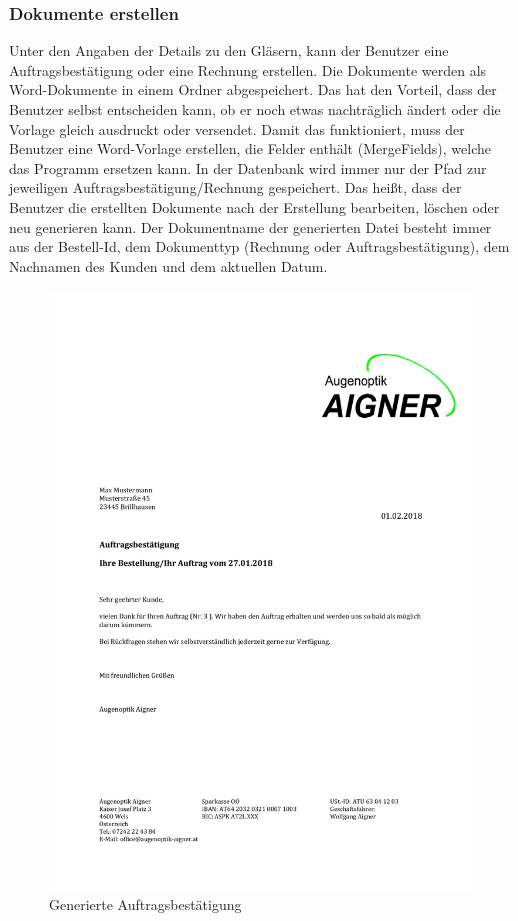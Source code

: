 \subsubsection{Dokumente erstellen}
Unter den Angaben der Details zu den Gläsern, kann der Benutzer eine Auftragsbestätigung oder eine Rechnung erstellen. Die Dokumente werden als Word-Dokumente in einem Ordner abgespeichert. Das hat den Vorteil, dass der Benutzer selbst entscheiden kann, ob er noch etwas nachträglich ändert oder die Vorlage gleich ausdruckt oder versendet. Damit das funktioniert, muss der Benutzer  eine Word-Vorlage erstellen, die Felder enthält (MergeFields), welche das Programm ersetzen kann. In der Datenbank wird immer nur der Pfad zur jeweiligen Auftragsbestätigung/Rechnung gespeichert. Das heißt, dass der Benutzer die erstellten Dokumente nach der Erstellung bearbeiten, löschen oder neu generieren kann. Der Dokumentname der generierten Datei besteht immer aus der Bestell-Id, dem Dokumenttyp (Rechnung oder Auftragsbestätigung), dem Nachnamen des Kunden und dem aktuellen Datum. 
\begin{figure}[H]
\begin{center}
	\includegraphics[scale=.75]{images/MusterAuftragsbestaetigung.pdf}
\end{center}
	\caption{Generierte Auftragsbest\"atigung}
	\label{fig:sample}
\end{figure}
